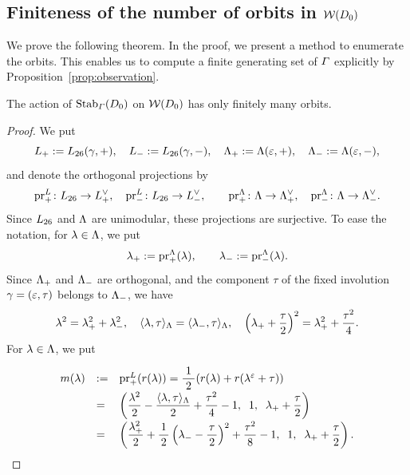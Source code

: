 \documentclass{amsart} %
\begin{document}
\subsection{Finiteness of the number of orbits in $\mathord{\mathcal{W}}(D_0)$}\label{subsec:finite}
%
We prove the following theorem.
In the proof,
we present a method to enumerate the orbits.
This enables us to compute a finite generating set of $\varGamma$
explicitly by Proposition~\ref{prop:observation}.
%
\begin{theorem}
The action of $\operatorname{Stab}_{\varGamma}(D_0)$ on $\mathord{\mathcal{W}}(D_0)$ has only finitely many orbits.
\end{theorem}
%
%
\begin{proof}
We put
\[
L_{+}:=L_{26}(\gamma, +),
\quad
L_{-}:=L_{26}(\gamma,-), 
\quad
\Lambda_{+}:=\Lambda(\varepsilon, +),
\quad
\Lambda_{-}:=\Lambda(\varepsilon,-), 
\]
and denote the orthogonal projections by
%
\[
\operatorname{pr}^{L}_{+} \colon L_{26}\to L_{+}^{\vee}, \quad 
\operatorname{pr}^{L}_{-}\colon L_{26}\to L_{-}^{\vee}, \qquad 
\operatorname{pr}^{\Lambda}_{+}\colon \Lambda\to \Lambda_{+}^{\vee}, \quad 
\operatorname{pr}^{\Lambda}_{-}\colon\Lambda\to \Lambda_{-}^{\vee}.
\]
%
Since $L_{26}$ and $\Lambda$ are unimodular, 
these projections are surjective.
%
%
%
To ease the notation, for $\lambda\in \Lambda$, 
we put
\[
{\lambda}_{+}:=\operatorname{pr}^{\Lambda}_{+}(\lambda),
\qquad 
{\lambda}_{-}:=\operatorname{pr}^{\Lambda}_{-}(\lambda).
\]
Since $\Lambda_{+}$ and $ \Lambda_{-}$ are orthogonal, and 
the component $\tau$ of 
the fixed involution $\gamma=(\varepsilon, \tau)$ belongs to $ \Lambda_{-}$, 
we have 
\[
\lambda^2={\lambda}_{+}^2+{\lambda}_{-}^2,
\quad
\langle \lambda, \tau \rangle_{\Lambda}=\langle {\lambda}_{-}, \tau \rangle_{\Lambda}, 
\quad
\left({\lambda}_{+} +\frac{\tau}{2} \right)^2={\lambda}_{+}^2+\frac{\tau^2}{4}.
\]
For $\lambda\in \Lambda$, we put
%
%
\begin{equation}\label{eq:defmlambda}
\renewcommand{\arraystretch}{2}
\begin{array}{lll}
m(\lambda) &:=& \prLplus(\LeechRoot{\lambda})=\dfrac{\;1\;}{2}(\LeechRoot{\lambda}+
\LeechRoot{\lambda^\vep+\tau})\\
&=&
\left(\dfrac{\lambda^2}{2}-\dfrac{\intfLeech{\lambda, \tau}}{2}+\dfrac{\tau^2}{4}-1, 
\;\; 1,\;\; \lambdaplus +\dfrac{\tau}{2}\right)\\
&=&
\left(
\dfrac{\lambdaplus^2}{2}+\dfrac{1}{\,2\,}\left(\lambdaminus-\dfrac{\tau}{\,2\,}\right)^2+\dfrac{\tau^2}{8}-1, 
\;\; 1,\;\; \lambdaplus +\dfrac{\tau}{2}\right).

\end{array}
\end{equation}
\end{proof}
\end{document}

